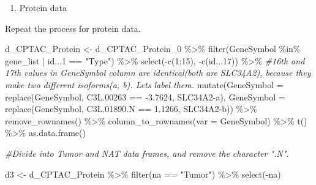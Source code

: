\documentclass[
]{article}
\newenvironment{Shaded}{\begin{snugshade}}{\end{snugshade}}
\newcommand{\AttributeTok}[1]{\textcolor[rgb]{0.77,0.63,0.00}{#1}}
\newcommand{\CommentTok}[1]{\textcolor[rgb]{0.56,0.35,0.01}{\textit{#1}}}
\newcommand{\DecValTok}[1]{\textcolor[rgb]{0.00,0.00,0.81}{#1}}
\newcommand{\FloatTok}[1]{\textcolor[rgb]{0.00,0.00,0.81}{#1}}
\newcommand{\FunctionTok}[1]{\textcolor[rgb]{0.00,0.00,0.00}{#1}}
\newcommand{\NormalTok}[1]{#1}
\newcommand{\OtherTok}[1]{\textcolor[rgb]{0.56,0.35,0.01}{#1}}
\newcommand{\SpecialCharTok}[1]{\textcolor[rgb]{0.00,0.00,0.00}{#1}}
\newcommand{\StringTok}[1]{\textcolor[rgb]{0.31,0.60,0.02}{#1}}
\providecommand{\tightlist}{%
  \setlength{\itemsep}{0pt}\setlength{\parskip}{0pt}}
\begin{document}
\begin{enumerate}
\def\labelenumi{(\arabic{enumi})}
\setcounter{enumi}{1}
\tightlist
\item
  Protein data
\end{enumerate}

Repeat the process for protein data.

\begin{Shaded}
\begin{Highlighting}[]
\NormalTok{d\_CPTAC\_Protein }\OtherTok{\textless{}{-}}\NormalTok{ d\_CPTAC\_Protein\_0 }\SpecialCharTok{\%\textgreater{}\%}
  \FunctionTok{filter}\NormalTok{(GeneSymbol }\SpecialCharTok{\%in\%}\NormalTok{ gene\_list }\SpecialCharTok{|}\NormalTok{ id...}\DecValTok{1} \SpecialCharTok{==} \StringTok{"Type"}\NormalTok{) }\SpecialCharTok{\%\textgreater{}\%}
  \FunctionTok{select}\NormalTok{(}\SpecialCharTok{{-}}\FunctionTok{c}\NormalTok{(}\DecValTok{1}\SpecialCharTok{:}\DecValTok{15}\NormalTok{), }\SpecialCharTok{{-}}\FunctionTok{c}\NormalTok{(id...}\DecValTok{17}\NormalTok{)) }\SpecialCharTok{\%\textgreater{}\%} \CommentTok{\#16th and 17th values in GeneSymbol column are identical(both are SLC34A2), because they make two different isoforms(a, b). Let\textquotesingle{}s label them.}
  \FunctionTok{mutate}\NormalTok{(}\AttributeTok{GeneSymbol =} \FunctionTok{replace}\NormalTok{(GeneSymbol, C3L}\FloatTok{.00263} \SpecialCharTok{==} \SpecialCharTok{{-}}\FloatTok{3.7624}\NormalTok{, }\StringTok{\textquotesingle{}SLC34A2{-}a\textquotesingle{}}\NormalTok{), }\AttributeTok{GeneSymbol =} \FunctionTok{replace}\NormalTok{(GeneSymbol, C3L.}\FloatTok{01890.}\NormalTok{N }\SpecialCharTok{==} \FloatTok{1.1266}\NormalTok{, }\StringTok{\textquotesingle{}SLC34A2{-}b\textquotesingle{}}\NormalTok{)) }\SpecialCharTok{\%\textgreater{}\%} 
  \FunctionTok{remove\_rownames}\NormalTok{() }\SpecialCharTok{\%\textgreater{}\%}
  \FunctionTok{column\_to\_rownames}\NormalTok{(}\AttributeTok{var =} \StringTok{\textquotesingle{}GeneSymbol\textquotesingle{}}\NormalTok{) }\SpecialCharTok{\%\textgreater{}\%}
  \FunctionTok{t}\NormalTok{() }\SpecialCharTok{\%\textgreater{}\%} 
  \FunctionTok{as.data.frame}\NormalTok{()}

\CommentTok{\#Divide into Tumor and NAT data frames, and remove the character ".N".}

\NormalTok{d3 }\OtherTok{\textless{}{-}}\NormalTok{ d\_CPTAC\_Protein }\SpecialCharTok{\%\textgreater{}\%} 
  \FunctionTok{filter}\NormalTok{(na }\SpecialCharTok{==} \StringTok{"Tumor"}\NormalTok{) }\SpecialCharTok{\%\textgreater{}\%} 
  \FunctionTok{select}\NormalTok{(}\SpecialCharTok{{-}}\NormalTok{na)}


\end{Highlighting}
\end{Shaded}
\end{document}
